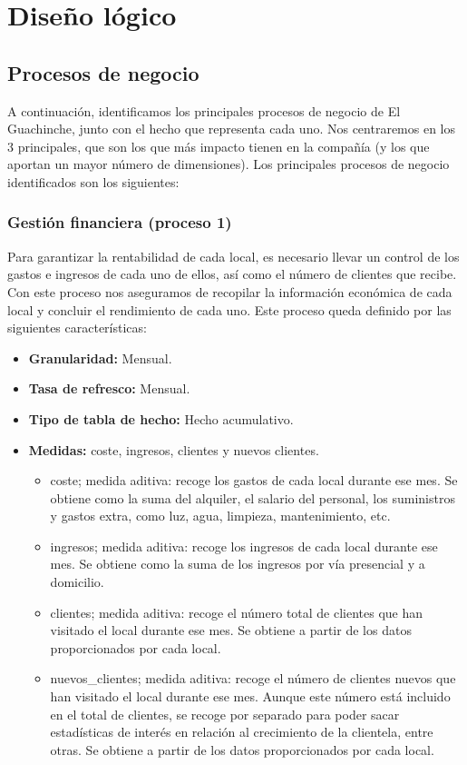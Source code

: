 \documentclass[12pt]{opticajnl}
\begin{document}
\section{Diseño lógico}

\subsection{Procesos de negocio}

A continuación, identificamos los principales procesos de negocio de El Guachinche, junto con el hecho que representa cada uno. Nos centraremos en los 3 principales, que son los que más impacto tienen en la compañía (y los que aportan un mayor número de dimensiones). Los principales procesos de negocio identificados son los siguientes:


\subsubsection{Gestión financiera (proceso 1)}

Para garantizar la rentabilidad de cada local, es necesario llevar un control de los gastos e ingresos de cada uno de ellos, así como el número de clientes que recibe. Con este proceso nos aseguramos de recopilar la información económica de cada local y concluir el rendimiento de cada uno. Este proceso queda definido por las siguientes características:
\begin{itemize}
\item \textbf{Granularidad:} Mensual.
\item \textbf{Tasa de refresco:} Mensual.
\item \textbf{Tipo de tabla de hecho:} Hecho acumulativo.
\item \textbf{Medidas:} coste, ingresos, clientes y nuevos clientes.
\begin{itemize}
\item coste; medida aditiva: recoge los gastos de cada local durante ese mes. Se obtiene como la suma del alquiler, el salario del personal, los suministros y gastos extra, como luz, agua, limpieza, mantenimiento, etc. 
\item ingresos; medida aditiva: recoge los ingresos de cada local durante ese mes. Se obtiene como la suma de los ingresos por vía presencial y a domicilio.
\item clientes; medida aditiva: recoge el número total de clientes que han visitado el local durante ese mes. Se obtiene a partir de los datos proporcionados por cada local.
\item nuevos\_clientes; medida aditiva: recoge el número de clientes nuevos que han visitado el local durante ese mes. Aunque este número está incluido en el total de clientes, se recoge por separado para poder sacar estadísticas de interés en relación al crecimiento de la clientela, entre otras. Se obtiene a partir de los datos proporcionados por cada local.
\end{itemize}
\end{itemize}
\end{document}

